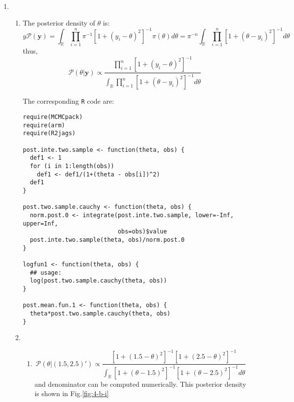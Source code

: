 \documentclass[twoside,11pt]{amsart}
\begin{document}
\begin{enumerate}
\begin{enumerate}
  \item
  \item
  \item
  \item
  \item
  \item
  \item
  \item
  \end{enumerate}

\item
  \begin{enumerate}
  \item The posterior density of $\theta$ is:
    \[ 
y    \mathscr P(\bm y) = 
    \int_{\mathbb R}\prod_{i=1}^n\pi^{-1}[1 +
    (y_i-\theta)^2]^{-1}\pi(\theta)d\theta = \pi^{-n}\int_{\mathbb R}\prod_{i=1}^n[1 +
    (\theta-y_i)^2]^{-1}d\theta 
    \]
    thus,
    \[ 
    \mathscr P(\theta|\bm y) \propto \frac{\prod_{i=1}^n[1 +
    (y_i-\theta)^2]^{-1}}{\int_{\mathbb R}\prod_{i=1}^n[1 +
    (\theta-y_i)^2]^{-1}d\theta}
    \]

    The corresponding {\tt R} code are:    
    \begin{small}
    \begin{verbatim}
require(MCMCpack)
require(arm)
require(R2jags)

post.inte.two.sample <- function(theta, obs) {
  def1 <- 1
  for (i in 1:length(obs))
    def1 <- def1/(1+(theta - obs[i])^2)
  def1
}

post.two.sample.cauchy <- function(theta, obs) {
  norm.post.0 <- integrate(post.inte.two.sample, lower=-Inf, upper=Inf, 
                           obs=obs)$value
  post.inte.two.sample(theta, obs)/norm.post.0
}

logfun1 <- function(theta, obs) {
  ## usage:
  log(post.two.sample.cauchy(theta, obs))
}

post.mean.fun.1 <- function(theta, obs) {
  theta*post.two.sample.cauchy(theta, obs)
}      
    \end{verbatim}
    \end{small}
  \item
    \begin{enumerate}
    \item
      \[ 
      \mathscr P\left(\theta|(1.5, 2.5)'\right) \propto \frac{[1 +
        (1.5 - \theta)^2]^{-1}[1 +
        (2.5 - \theta)^2]^{-1}}{\int_{\mathbb R}[1 +
        (\theta - 1.5)^2]^{-1}[1 +
        (\theta - 2.5)^2]^{-1}d\theta}
      \]
      and denominator can be computed numerically. This posterior
      density is shown in Fig.\ref{fig:4-b-i}


\end{enumerate}
\end{enumerate}
\end{enumerate}
\end{document}
